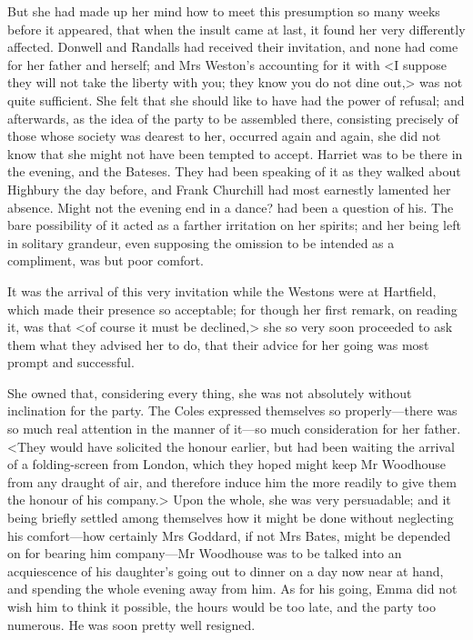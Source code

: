 But she had made up her mind how to meet this presumption so many weeks before it appeared, that when the insult came at last, it found her very differently affected. Donwell and Randalls had received their invitation, and none had come for her father and herself; and Mrs Weston's accounting for it with <I suppose they will not take the liberty with you; they know you do not dine out,> was not quite sufficient. She felt that she should like to have had the power of refusal; and afterwards, as the idea of the party to be assembled there, consisting precisely of those whose society was dearest to her, occurred again and again, she did not know that she might not have been tempted to accept. Harriet was to be there in the evening, and the Bateses. They had been speaking of it as they walked about Highbury the day before, and Frank Churchill had most earnestly lamented her absence. Might not the evening end in a dance? had been a question of his. The bare possibility of it acted as a farther irritation on her spirits; and her being left in solitary grandeur, even supposing the omission to be intended as a compliment, was but poor comfort.

It was the arrival of this very invitation while the Westons were at Hartfield, which made their presence so acceptable; for though her first remark, on reading it, was that <of course it must be declined,> she so very soon proceeded to ask them what they advised her to do, that their advice for her going was most prompt and successful.

She owned that, considering every thing, she was not absolutely without inclination for the party. The Coles expressed themselves so properly—there was so much real attention in the manner of it—so much consideration for her father. <They would have solicited the honour earlier, but had been waiting the arrival of a folding-screen from London, which they hoped might keep Mr Woodhouse from any draught of air, and therefore induce him the more readily to give them the honour of his company.> Upon the whole, she was very persuadable; and it being briefly settled among themselves how it might be done without neglecting his comfort—how certainly Mrs Goddard, if not Mrs Bates, might be depended on for bearing him company—Mr Woodhouse was to be talked into an acquiescence of his daughter's going out to dinner on a day now near at hand, and spending the whole evening away from him. As for his going, Emma did not wish him to think it possible, the hours would be too late, and the party too numerous. He was soon pretty well resigned.

